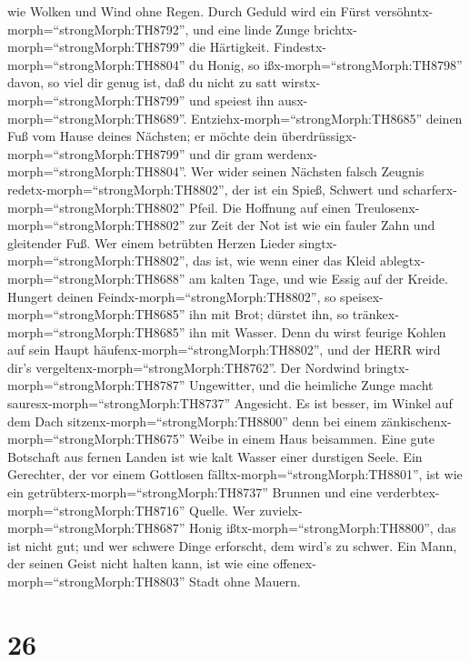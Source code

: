 wie Wolken und Wind ohne Regen.  Durch Geduld wird ein
Fürst versöhntx-morph=``strongMorph:TH8792'', und eine linde Zunge
brichtx-morph=``strongMorph:TH8799'' die Härtigkeit. 
Findestx-morph=``strongMorph:TH8804'' du Honig, so
ißx-morph=``strongMorph:TH8798'' davon, so viel dir genug ist, daß du
nicht zu satt wirstx-morph=``strongMorph:TH8799'' und speiest ihn
ausx-morph=``strongMorph:TH8689''. 
Entziehx-morph=``strongMorph:TH8685'' deinen Fuß vom Hause deines
Nächsten; er möchte dein überdrüssigx-morph=``strongMorph:TH8799'' und
dir gram werdenx-morph=``strongMorph:TH8804''.  Wer wider
seinen Nächsten falsch Zeugnis redetx-morph=``strongMorph:TH8802'', der
ist ein Spieß, Schwert und scharferx-morph=``strongMorph:TH8802'' Pfeil.
 Die Hoffnung auf einen
Treulosenx-morph=``strongMorph:TH8802'' zur Zeit der Not ist wie ein
fauler Zahn und gleitender Fuß.  Wer einem betrübten Herzen
Lieder singtx-morph=``strongMorph:TH8802'', das ist, wie wenn einer das
Kleid ablegtx-morph=``strongMorph:TH8688'' am kalten Tage, und wie Essig
auf der Kreide.  Hungert deinen
Feindx-morph=``strongMorph:TH8802'', so
speisex-morph=``strongMorph:TH8685'' ihn mit Brot; dürstet ihn, so
tränkex-morph=``strongMorph:TH8685'' ihn mit Wasser.  Denn
du wirst feurige Kohlen auf sein Haupt
häufenx-morph=``strongMorph:TH8802'', und der HERR wird dir's
vergeltenx-morph=``strongMorph:TH8762''.  Der Nordwind
bringtx-morph=``strongMorph:TH8787'' Ungewitter, und die heimliche Zunge
macht sauresx-morph=``strongMorph:TH8737'' Angesicht.  Es
ist besser, im Winkel auf dem Dach sitzenx-morph=``strongMorph:TH8800''
denn bei einem zänkischenx-morph=``strongMorph:TH8675'' Weibe in einem
Haus beisammen.  Eine gute Botschaft aus fernen Landen ist
wie kalt Wasser einer durstigen Seele.  Ein Gerechter, der
vor einem Gottlosen fälltx-morph=``strongMorph:TH8801'', ist wie ein
getrübterx-morph=``strongMorph:TH8737'' Brunnen und eine
verderbtex-morph=``strongMorph:TH8716'' Quelle.  Wer
zuvielx-morph=``strongMorph:TH8687'' Honig
ißtx-morph=``strongMorph:TH8800'', das ist nicht gut; und wer schwere
Dinge erforscht, dem wird's zu schwer.  Ein Mann, der
seinen Geist nicht halten kann, ist wie eine
offenex-morph=``strongMorph:TH8803'' Stadt ohne Mauern.

\hypertarget{section-25}{%
\section{26}\label{section-25}}

